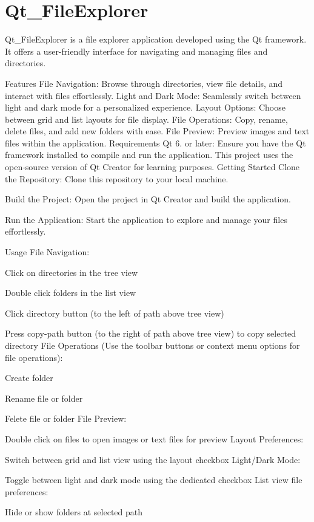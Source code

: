 \chapter{Qt\+\_\+\+File\+Explorer}
\label{md__c_1_2_users_2macwe_2_documents_2_qt-_projects_2_qt___file_explorer_2_r_e_a_d_m_e}
\label{md__c_1_2_users_2macwe_2_documents_2_qt-_projects_2_qt___file_explorer_2_r_e_a_d_m_e_autotoc_md0}%
Qt\+\_\+\+File\+Explorer is a file explorer application developed using the Qt framework. It offers a user-\/friendly interface for navigating and managing files and directories.

Features File Navigation\+: Browse through directories, view file details, and interact with files effortlessly. Light and Dark Mode\+: Seamlessly switch between light and dark mode for a personalized experience. Layout Options\+: Choose between grid and list layouts for file display. File Operations\+: Copy, rename, delete files, and add new folders with ease. File Preview\+: Preview images and text files within the application. Requirements Qt 6. or later\+: Ensure you have the Qt framework installed to compile and run the application. This project uses the open-\/source version of Qt Creator for learning purposes. Getting Started Clone the Repository\+: Clone this repository to your local machine.

Build the Project\+: Open the project in Qt Creator and build the application.

Run the Application\+: Start the application to explore and manage your files effortlessly.

Usage File Navigation\+:
\begin{DoxyItemize}
\item Click on directories in the tree view
\item Double click folders in the list view
\item Click directory button (to the left of path above tree view)
\item Press copy-\/path button (to the right of path above tree view) to copy selected directory File Operations (Use the toolbar buttons or context menu options for file operations)\+:
\item Create folder
\item Rename file or folder
\item Felete file or folder File Preview\+:
\item Double click on files to open images or text files for preview Layout Preferences\+:
\item Switch between grid and list view using the layout checkbox Light/\+Dark Mode\+:
\item Toggle between light and dark mode using the dedicated checkbox List view file preferences\+:
\item Hide or show folders at selected path
\end{DoxyItemize}

